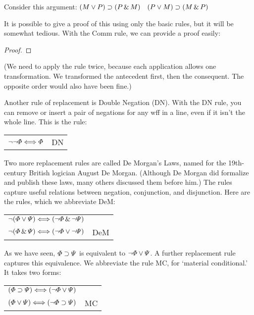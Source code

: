 Consider this argument: $(M \vee P) \supset (P \,\&\, M)$ \therefore\ $(P \vee M) \supset (M \,\&\, P)$

It is possible to give a proof of this using only the basic rules, but it will be somewhat tedious. With the Comm rule, we can provide a proof easily:

\begin{proof}
\end{proof}

(We need to apply the rule twice, because each application allows one transformation. We transformed the antecedent first, then the consequent. The opposite order would also have been fine.)

Another rule of replacement is Double Negation (DN). With the DN rule, you can remove or insert a pair of negations for any wff in a line, even if it isn't the whole line. This is the rule:

\begin{center}
\begin{tabular}{rl}
$\neg\neg\varPhi{} \Longleftrightarrow \varPhi{}$ & DN
\end{tabular}
\end{center}

Two more replacement rules  are called De Morgan's Laws, named for the 19th-century British logician August De Morgan. (Although De Morgan did formalize and publish these laws, many others discussed them before him.) The rules capture useful relations between negation, conjunction, and disjunction. Here are the rules, which we abbreviate DeM:

\begin{center}
\begin{tabular}{rl}
$\neg(\varPhi{}\vee\varPsi{}) \Longleftrightarrow (\neg\varPhi{}\,\&\,\neg\varPsi{})$\\
$\neg(\varPhi{}\,\&\,\varPsi{}) \Longleftrightarrow (\neg\varPhi{}\vee\neg\varPsi{})$
& DeM
\end{tabular}
\end{center}

As we have seen, $\varPhi{}\supset\varPsi{}$ is equivalent to $\neg\varPhi{}\vee\varPsi{}$. A further replacement rule captures this equivalence. We abbreviate the rule MC, for `material conditional.' It takes two forms:

\begin{center}
\begin{tabular}{rl}
$(\varPhi{}\supset\varPsi{}) \Longleftrightarrow (\neg\varPhi{}\vee\varPsi{})$ &\\
$(\varPhi{}\vee\varPsi{}) \Longleftrightarrow (\neg\varPhi{}\supset\varPsi{})$ & MC
\end{tabular}
\end{center}

